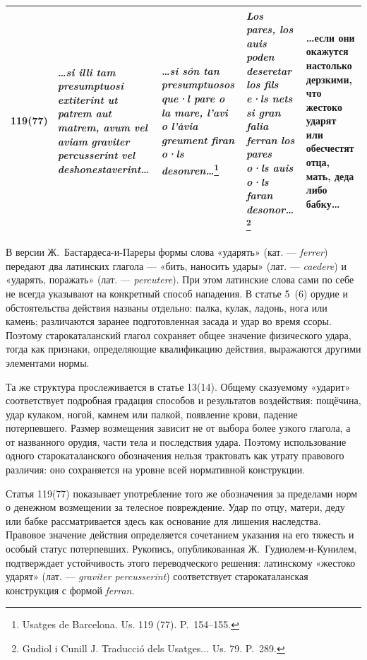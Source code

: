 \begin{center}
\begin{longtable}{|p{}|p{}|p{}|p{}|p{}|}
\textbf{119(77)} & \emph{…si illi tam presumptuosi extiterint ut patrem aut matrem, avum vel aviam }\emph{graviter }\textbf{\emph{percusserint}}\emph{ vel deshonestaverint…} & \emph{…si són tan presumptuosos que·l pare o la mare, l’avi o }\emph{l’àvia greument }\textbf{\emph{firan}}\emph{ o·ls desonren…}\footnote{Usatges de Barcelona. Us. 119 (77). P.~154--155.} & \emph{Los pares, los auis poden deseretar los fils e·ls nets si gran }\textbf{\emph{falia ferran}}\emph{ los }\emph{pares o·ls auis o·ls faran desonor…}\footnote{Gudiol i Cunill J. Traducció dels Usatges... Us. 79. P.~289.} & …если они окажутся настолько дерзкими, что жестоко ударят или обесчестят отца, мать, деда либо бабку… \\ \hline
\end{longtable}
\end{center}

В версии Ж.~Бастардеса-и-Пареры формы слова «ударять» (кат. --- \emph{ferrer}) передают два латинских глагола --- «бить, наносить удары» (лат. --- \emph{caedere}) и «ударять, поражать» (лат. --- \emph{percutere}). При этом латинские слова сами по себе не всегда указывают на конкретный способ нападения. В статье 5~(6) орудие и обстоятельства действия названы отдельно: палка, кулак, ладонь, нога или камень; различаются заранее подготовленная засада и удар во время ссоры. Поэтому старокаталанский глагол сохраняет общее значение физического удара, тогда как признаки, определяющие квалификацию действия, выражаются другими элементами нормы.

Та же структура прослеживается в статье 13(14). Общему сказуемому «ударит» соответствует подробная градация способов и результатов воздействия: пощёчина, удар кулаком, ногой, камнем или палкой, появление крови, падение потерпевшего. Размер возмещения зависит не от выбора более узкого глагола, а от названного орудия, части тела и последствия удара. Поэтому использование одного старокаталанского обозначения нельзя трактовать как утрату правового различия: оно сохраняется на уровне всей нормативной конструкции.

Статья 119(77) показывает употребление того же обозначения за пределами норм о денежном возмещении за телесное повреждение. Удар по отцу, матери, деду или бабке рассматривается здесь как основание для лишения наследства. Правовое значение действия определяется сочетанием указания на его тяжесть и особый статус потерпевших. Рукопись, опубликованная Ж.~Гудиолем-и-Кунилем, подтверждает устойчивость этого переводческого решения: латинскому «жестоко ударят» (лат. --- \emph{graviter percusserint}) соответствует старокаталанская конструкция с формой \emph{ferran}.

